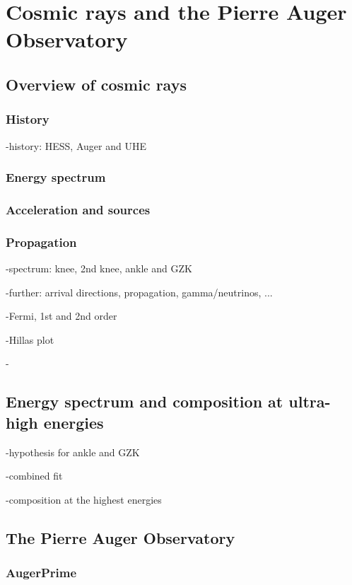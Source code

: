 \chapter{Cosmic rays and the Pierre Auger Observatory}
\label{sec:uhecr}


\section{Overview of cosmic rays}
\label{sec:uhecr:overview}

\subsection{History}

-history: HESS, Auger and UHE

\subsection{Energy spectrum}

\subsection{Acceleration and sources}

\subsection{Propagation}


-spectrum: knee, 2nd knee, ankle and GZK

-further: arrival directions, propagation, gamma/neutrinos, ...

-Fermi, 1st and 2nd order

-Hillas plot

-

\section{Energy spectrum and composition at ultra-high energies}
\label{sec:uhecr:spectrum}

-hypothesis for ankle and GZK

-combined fit

-composition at the highest energies


\section{The Pierre Auger Observatory}
\label{sec:uhecr:auger}


\subsection{AugerPrime}






